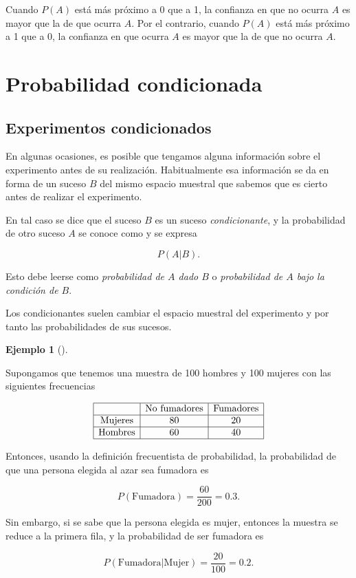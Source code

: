 \documentclass[
  spanish,
  a4paper,
]{scrreport}
\theoremstyle{plain}
\theoremstyle{definition}
\newtheorem{example}{Ejemplo}[chapter]
\theoremstyle{definition}
\theoremstyle{remark}
\begin{document}
Cuando \(P(A)\) está más próximo a 0 que a 1, la confianza en que no
ocurra \(A\) es mayor que la de que ocurra \(A\). Por el contrario,
cuando \(P(A)\) está más próximo a 1 que a 0, la confianza en que ocurra
\(A\) es mayor que la de que no ocurra \(A\).

\section{Probabilidad condicionada}\label{probabilidad-condicionada}

\subsection{Experimentos
condicionados}\label{experimentos-condicionados}

En algunas ocasiones, es posible que tengamos alguna información sobre
el experimento antes de su realización. Habitualmente esa información se
da en forma de un suceso \(B\) del mismo espacio muestral que sabemos
que es cierto antes de realizar el experimento.

En tal caso se dice que el suceso \(B\) es un suceso
\emph{condicionante}, y la probabilidad de otro suceso \(A\) se conoce
como y se expresa

\[P(A|B).\]

Esto debe leerse como \emph{probabilidad de \(A\) dado \(B\)} o
\emph{probabilidad de \(A\) bajo la condición de \(B\)}.

Los condicionantes suelen cambiar el espacio muestral del experimento y
por tanto las probabilidades de sus sucesos.

\begin{example}[]\protect\hypertarget{exm-sucesos-condicionados}{}\label{exm-sucesos-condicionados}

Supongamos que tenemos una muestra de 100 hombres y 100 mujeres con las
siguientes frecuencias

\[
\begin{array}{|c|c|c|}
\hline 
 & \mbox{No fumadores} & \mbox{Fumadores} \\
 \hline 
 \mbox{Mujeres} & 80 & 20 \\
 \hline
 \mbox{Hombres} & 60 & 40 \\
 \hline
\end{array}
\]

Entonces, usando la definición frecuentista de probabilidad, la
probabilidad de que una persona elegida al azar sea fumadora es

\[P(\mbox{Fumadora})= \frac{60}{200}=0.3.\]

Sin embargo, si se sabe que la persona elegida es mujer, entonces la
muestra se reduce a la primera fila, y la probabilidad de ser fumadora
es

\[P(\mbox{Fumadora}|\mbox{Mujer})=\frac{20}{100}=0.2.\]

\end{example}
\end{document}
